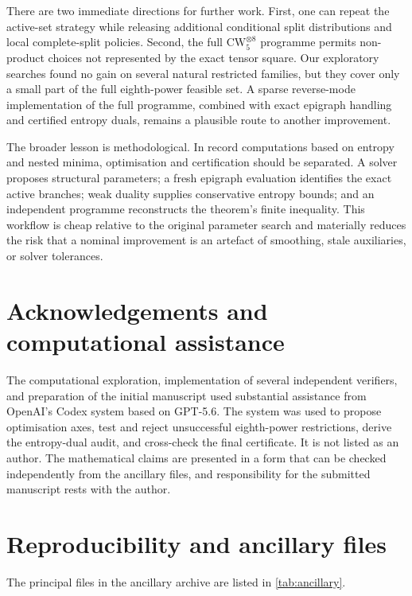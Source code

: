 \documentclass[11pt,reqno]{amsart}
\theoremstyle{definition}
\theoremstyle{remark}
\newcommand{\CW}{\mathrm{CW}}
\begin{document}
There are two immediate directions for further work.  First, one can repeat the active-set strategy while
releasing additional conditional split distributions and local complete-split policies.  Second, the full
$\CW_5^{\otimes8}$ programme permits non-product choices not represented by the exact tensor square.
Our exploratory searches found no gain on several natural restricted families, but they cover only a small
part of the full eighth-power feasible set.  A sparse reverse-mode implementation of the full programme,
combined with exact epigraph handling and certified entropy duals, remains a plausible route to another
improvement.

The broader lesson is methodological.  In record computations based on entropy and nested minima,
optimisation and certification should be separated.  A solver proposes structural parameters; a fresh
epigraph evaluation identifies the exact active branches; weak duality supplies conservative entropy
bounds; and an independent programme reconstructs the theorem's finite inequality.  This workflow is
cheap relative to the original parameter search and materially reduces the risk that a nominal improvement
is an artefact of smoothing, stale auxiliaries, or solver tolerances.

\section*{Acknowledgements and computational assistance}

The computational exploration, implementation of several independent verifiers, and preparation of the
initial manuscript used substantial assistance from OpenAI's Codex system based on GPT-5.6.  The system
was used to propose optimisation axes, test and reject unsuccessful eighth-power restrictions, derive the
entropy-dual audit, and cross-check the final certificate.  It is not listed as an author.  The mathematical
claims are presented in a form that can be checked independently from the ancillary files, and responsibility
for the submitted manuscript rests with the author.

\section{Reproducibility and ancillary files}

The principal files in the ancillary archive are listed in \cref{tab:ancillary}.
\end{document}

